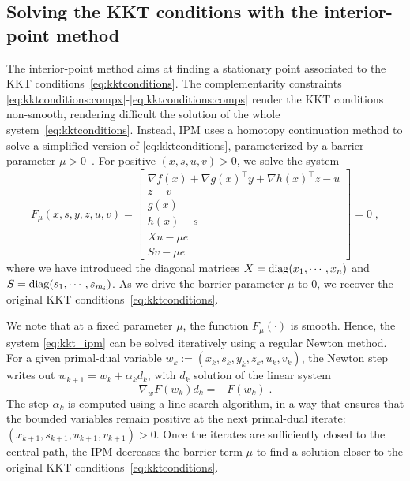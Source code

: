 \subsection{Solving the KKT conditions with the interior-point method}
\label{sec:ipm:kkt}
The interior-point method aims at finding a stationary point
associated to the KKT conditions~\eqref{eq:kktconditions}.
The complementarity constraints \eqref{eq:kktconditions:compx}-\eqref{eq:kktconditions:comps}
render the KKT conditions non-smooth, rendering difficult the solution of
the whole system~\eqref{eq:kktconditions}.
Instead, IPM uses a homotopy continuation method to solve a simplified
version of \eqref{eq:kktconditions}, parameterized by a barrier
parameter $\mu > 0$~\cite[Chapter 19]{nocedal_numerical_2006}.
For positive $(x, s, u, v) > 0$, we solve the system
\begin{equation}
  \label{eq:kkt_ipm}
  F_\mu(x, s, y, z, u, v) =
  \begin{bmatrix}
       \nabla f(x) + \nabla g(x)^\top y + \nabla h(x)^\top z - u  \\
       z - v  \\
       g(x)  \\
       h(x) + s  \\
       X u - \mu e  \\
       S v - \mu e
  \end{bmatrix}
  = 0 \; ,
\end{equation}
where we have introduced the diagonal matrices $X = \operatorname{diag}(x_1, \cdots, x_n)$
and $S = \operatorname{diag}(s_1, \cdots, s_{m_i})$.
As we drive the barrier parameter $\mu$ to $0$, we recover the original
KKT conditions~\eqref{eq:kktconditions}.

We note that at a fixed parameter $\mu$, the function $F_\mu(\cdot)$
is smooth. Hence, the system \eqref{eq:kkt_ipm} can be solved iteratively
using a regular Newton method. For a given primal-dual variable
$w_k := (x_k, s_k, y_k, z_k, u_k, v_k)$, the Newton step writes out
$w_{k+1} = w_k + \alpha_k d_k$, with $d_k$ solution of the linear system
\begin{equation}
  \label{eq:newton_step}
  \nabla_w F(w_k) d_k = -F(w_k) \; .
\end{equation}
The step $\alpha_k$ is computed using a line-search algorithm, in a way
that ensures that the bounded variables remain positive
at the next primal-dual iterate: $(x_{k+1}, s_{k+1}, u_{k+1}, v_{k+1}) > 0$.
Once the iterates are sufficiently closed to the central path,
the IPM decreases the barrier term $\mu$ to find a solution closer to
the original KKT conditions~\eqref{eq:kktconditions}.

